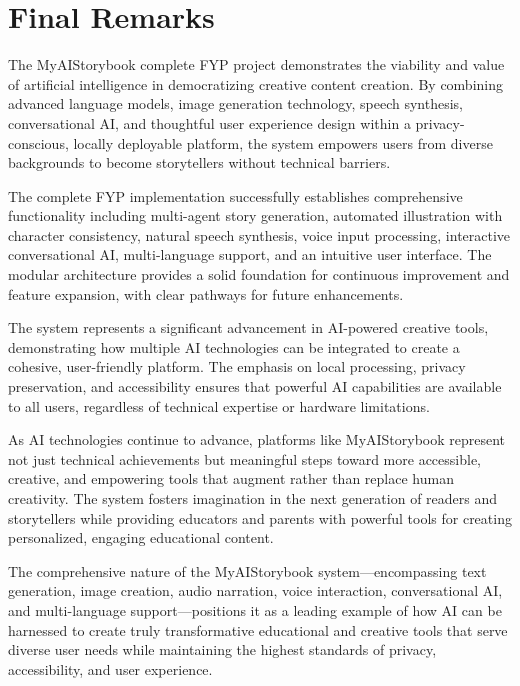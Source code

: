 \section{Final Remarks}
The MyAIStorybook complete FYP project demonstrates the viability and value of artificial intelligence in democratizing creative content creation. By combining advanced language models, image generation technology, speech synthesis, conversational AI, and thoughtful user experience design within a privacy-conscious, locally deployable platform, the system empowers users from diverse backgrounds to become storytellers without technical barriers.

The complete FYP implementation successfully establishes comprehensive functionality including multi-agent story generation, automated illustration with character consistency, natural speech synthesis, voice input processing, interactive conversational AI, multi-language support, and an intuitive user interface. The modular architecture provides a solid foundation for continuous improvement and feature expansion, with clear pathways for future enhancements.

The system represents a significant advancement in AI-powered creative tools, demonstrating how multiple AI technologies can be integrated to create a cohesive, user-friendly platform. The emphasis on local processing, privacy preservation, and accessibility ensures that powerful AI capabilities are available to all users, regardless of technical expertise or hardware limitations.

As AI technologies continue to advance, platforms like MyAIStorybook represent not just technical achievements but meaningful steps toward more accessible, creative, and empowering tools that augment rather than replace human creativity. The system fosters imagination in the next generation of readers and storytellers while providing educators and parents with powerful tools for creating personalized, engaging educational content.

The comprehensive nature of the MyAIStorybook system—encompassing text generation, image creation, audio narration, voice interaction, conversational AI, and multi-language support—positions it as a leading example of how AI can be harnessed to create truly transformative educational and creative tools that serve diverse user needs while maintaining the highest standards of privacy, accessibility, and user experience.

\clearpage
